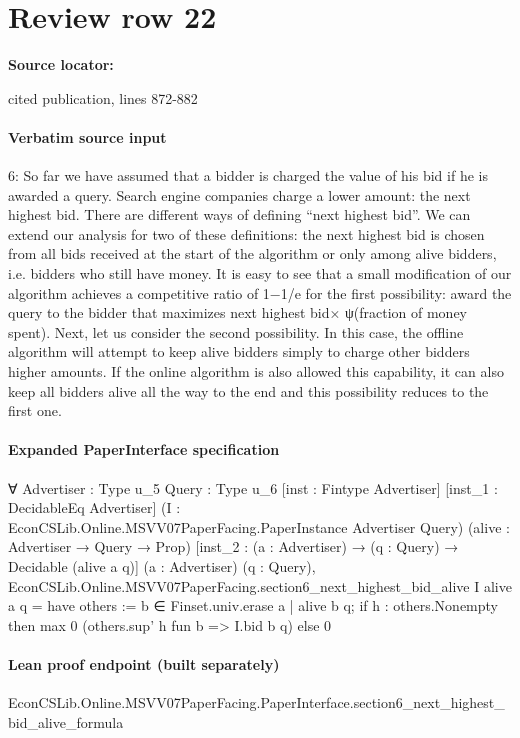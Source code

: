 \documentclass[10pt]{article}
\begin{document}
\section*{Review row 22}
\textbf{Source locator:} {\footnotesize\raggedright cited publication, lines 872-\allowbreak{}882\par}
\paragraph{Verbatim source input}
\begin{ReviewVerbatim}
6: So far we have assumed that a bidder is charged the value of his bid if he is awarded a query.
Search engine companies charge a lower amount: the next highest bid. There are different ways
of defining “next highest bid”. We can extend our analysis for two of these definitions: the
next highest bid is chosen from all bids received at the start of the algorithm or only among
alive bidders, i.e. bidders who still have money.
It is easy to see that a small modification of our algorithm achieves a competitive ratio of
1−1/e for the first possibility: award the query to the bidder that maximizes next highest bid×
ψ(fraction of money spent). Next, let us consider the second possibility. In this case, the offline
algorithm will attempt to keep alive bidders simply to charge other bidders higher amounts.
If the online algorithm is also allowed this capability, it can also keep all bidders alive all the
way to the end and this possibility reduces to the first one.
\end{ReviewVerbatim}


\paragraph{Expanded PaperInterface specification}
\begin{ReviewVerbatim}
∀ {Advertiser : Type u_5} {Query : Type u_6} [inst : Fintype Advertiser] [inst_1 : DecidableEq Advertiser]
  (I : EconCSLib.Online.MSVV07PaperFacing.PaperInstance Advertiser Query) (alive : Advertiser → Query → Prop)
  [inst_2 : (a : Advertiser) → (q : Query) → Decidable (alive a q)] (a : Advertiser) (q : Query),
  EconCSLib.Online.MSVV07PaperFacing.section6_next_highest_bid_alive I alive a q =
    have others := {b ∈ Finset.univ.erase a | alive b q};
    if h : others.Nonempty then max 0 (others.sup' h fun b => I.bid b q) else 0
\end{ReviewVerbatim}

\paragraph{Lean proof endpoint (built separately)}\begin{ReviewVerbatim}
EconCSLib.Online.MSVV07PaperFacing.PaperInterface.section6_next_highest_bid_alive_formula
\end{ReviewVerbatim}
\end{document}
